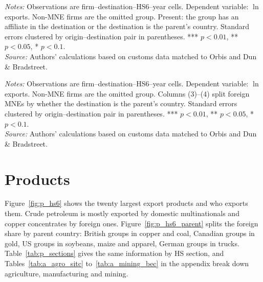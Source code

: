 \documentclass[11pt,a4paper]{article}
\begin{document}
\begin{table}[H]\centering\small%
  \caption{Distance and Firm Exports: Multinationals by Presence at the Destination}%
  \label{tab:p_t2}%
  \par\vspace{3pt}%
  \begin{minipage}{0.95\textwidth}\footnotesize %
  \textit{Notes:} Observations are firm--destination--HS6--year cells. Dependent variable: $\ln$ exports. Non-MNE firms are the omitted group. Present: the group has an affiliate in the destination or the destination is the parent's country. Standard errors clustered by origin--destination pair in parentheses. *** $p<0.01$, ** $p<0.05$, * $p<0.1$.\\[3pt]%
  \textit{Source:} Authors' calculations based on customs data matched to Orbis and Dun \& Bradstreet.%
  \end{minipage}%
  \end{table}
\begin{table}[H]\centering\small%
  \caption{Distance and Firm Exports: Foreign and Domestic Multinationals}%
  \label{tab:p_dist}%
  \par\vspace{3pt}%
  \begin{minipage}{0.95\textwidth}\footnotesize %
  \textit{Notes:} Observations are firm--destination--HS6--year cells. Dependent variable: $\ln$ exports. Non-MNE firms are the omitted group. Columns (3)--(4) split foreign MNEs by whether the destination is the parent's country. Standard errors clustered by origin--destination pair in parentheses. *** $p<0.01$, ** $p<0.05$, * $p<0.1$.\\[3pt]%
  \textit{Source:} Authors' calculations based on customs data matched to Orbis and Dun \& Bradstreet.%
  \end{minipage}%
  \end{table}

\section{Products}\label{sec:products}
Figure~\ref{fig:p_hs6} shows the twenty largest export products and who exports them. Crude
petroleum is mostly exported by domestic multinationals and copper concentrates by foreign ones.
Figure~\ref{fig:p_hs6_parent} splits the foreign share by parent country: British groups in copper
and coal, Canadian groups in gold, US groups in soybeans, maize and apparel, German groups in
trucks. Table~\ref{tab:p_sections} gives the same information by HS section, and
Tables~\ref{tab:a_agro_sitc} to~\ref{tab:a_mining_bec} in the appendix break down agriculture,
manufacturing and mining.
\end{document}
